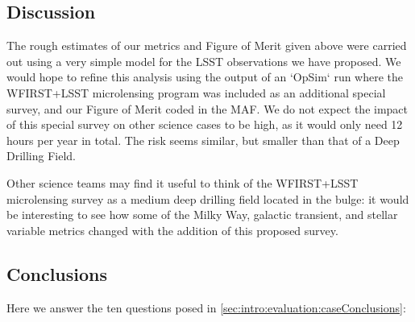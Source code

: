 %
%
%
%

\subsection{Discussion}
\label{sec:\secname:discussion}

The rough estimates of our metrics and Figure of Merit given above were
carried out using a very simple model for the LSST observations we
have proposed. We would hope to refine this analysis using the output
of an `OpSim` run where the WFIRST+LSST microlensing program was included
as an additional special survey, and our Figure of Merit coded in the
MAF. We do not expect the impact of this special survey on other science cases
to be high, as it would only need 12 hours per year in total. The risk
seems similar, but smaller than that of a Deep Drilling Field.

Other science teams may find it useful to think of the WFIRST+LSST microlensing
survey as a medium deep drilling field located in the bulge: it would be interesting
to see how some of the Milky Way, galactic transient, and  stellar variable
metrics changed with the addition of this proposed survey.



\subsection{Conclusions}

Here we answer the ten questions posed in
\autoref{sec:intro:evaluation:caseConclusions}:


